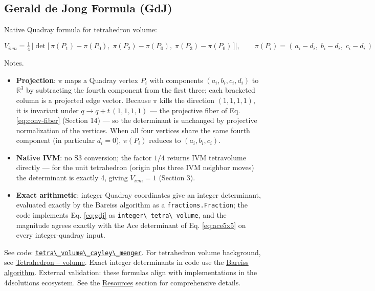 \documentclass[
  10pt,
]{article}
\newcommand{\passthrough}[1]{#1}
\providecommand{\tightlist}{%
  \setlength{\itemsep}{0pt}\setlength{\parskip}{0pt}}
\begin{document}
\subsection{Gerald de Jong Formula
(GdJ)}\label{gerald-de-jong-formula-gdj}

Native Quadray formula for tetrahedron volume:

\begin{equation}\label{eq:gdj}
V_{ivm} = \tfrac{1}{4}\,\left|\det\big[\, \pi(P_1) - \pi(P_0),\; \pi(P_2) - \pi(P_0),\; \pi(P_3) - \pi(P_0) \,\big]\right|, \qquad \pi(P_i) = (\,a_i - d_i,\; b_i - d_i,\; c_i - d_i\,)
\end{equation}

Notes.

\begin{itemize}
\tightlist
\item
  \textbf{Projection}: \(\pi\) maps a Quadray vertex \(P_i\) with
  components \((a_i, b_i, c_i, d_i)\) to \(\mathbb{R}^3\) by subtracting
  the fourth component from the first three; each bracketed column is a
  projected edge vector. Because \(\pi\) kills the direction
  \((1,1,1,1)\), it is invariant under \(q \to q + t\,(1,1,1,1)\) ---
  the projective fiber of Eq. \eqref{eq:conv-fiber} (Section 14) --- so
  the determinant is unchanged by projective normalization of the
  vertices. When all four vertices share the same fourth component (in
  particular \(d_i = 0\)), \(\pi(P_i)\) reduces to \((a_i, b_i, c_i)\).
\item
  \textbf{Native IVM}: no S3 conversion; the factor \(1/4\) returns IVM
  tetravolume directly --- for the unit tetrahedron (origin plus three
  IVM neighbor moves) the determinant is exactly 4, giving
  \(V_{ivm} = 1\) (Section 3).
\item
  \textbf{Exact arithmetic}: integer Quadray coordinates give an integer
  determinant, evaluated exactly by the Bareiss algorithm as a
  \passthrough{\lstinline!fractions.Fraction!}; the code implements Eq.
  \eqref{eq:gdj} as \passthrough{\lstinline!integer\_tetra\_volume!},
  and the magnitude agrees exactly with the Ace determinant of Eq.
  \eqref{eq:ace5x5} on every integer-quadray input.
\end{itemize}

See code:
\href{03_quadray_methods.md\#code:tetra_volume_cayley_menger}{\passthrough{\lstinline!tetra\_volume\_cayley\_menger!}}.
For tetrahedron volume background, see
\href{https://en.wikipedia.org/wiki/Tetrahedron\#Volume}{Tetrahedron --
volume}. Exact integer determinants in code use the
\href{https://en.wikipedia.org/wiki/Bareiss_algorithm}{Bareiss
algorithm}. External validation: these formulas align with
implementations in the 4dsolutions ecosystem. See the
\href{07_resources.md}{Resources} section for comprehensive details.
\end{document}
